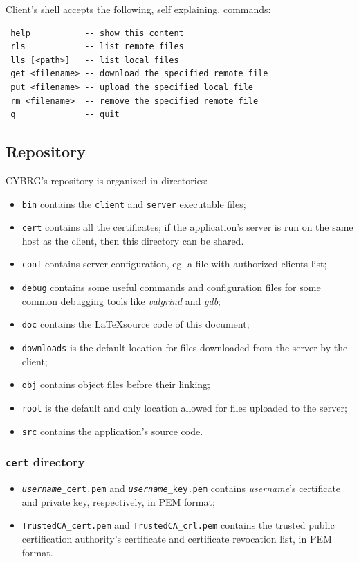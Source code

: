 \documentclass[a4paper,12pt]{article}
\newcommand{\projectname}{CYBRG}
\begin{document}
Client's shell accepts the following, self explaining, commands:
\begin{verbatim}
 help           -- show this content
 rls            -- list remote files
 lls [<path>]   -- list local files
 get <filename> -- download the specified remote file
 put <filename> -- upload the specified local file
 rm <filename>  -- remove the specified remote file
 q              -- quit
\end{verbatim}

\subsection{Repository}
\projectname{}'s repository is organized in directories:
\begin{itemize}
  \item \texttt{bin} contains the \texttt{client} and \texttt{server} executable files;
  \item \texttt{cert} contains all the certificates; if the application's server is run on the same host as the client, then this directory can be shared.
  \item \texttt{conf} contains server configuration, eg. a file with authorized clients list;
  \item \texttt{debug} contains some useful commands and configuration files for some common debugging tools like \emph{valgrind} and \emph{gdb};
  \item \texttt{doc} contains the \LaTeX source code of this document;
  \item \texttt{downloads} is the default location for files downloaded from the server by the client;
  \item \texttt{obj} contains object files before their linking;
  \item \texttt{root} is the default and only location allowed for files uploaded to the server;
  \item \texttt{src} contains the application's source code.
\end{itemize}

\subsubsection{\texttt{cert} directory}
\begin{itemize}
    \item \texttt{\emph{username}\_cert.pem} and \texttt{\emph{username}\_key.pem} contains \emph{username}'s certificate and private key, respectively, in PEM format;
    \item \texttt{TrustedCA\_cert.pem} and \texttt{TrustedCA\_crl.pem} contains the trusted public certification authority's certificate and certificate revocation list, in PEM format.
\end{itemize}
\end{document}
